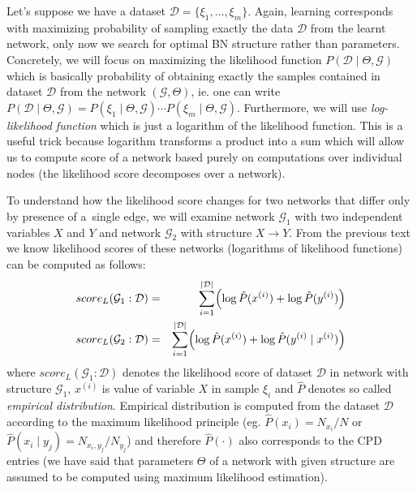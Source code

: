 \documentclass[english,cover]{fitthesis} %
\newcommand{\term}[1]{\emph{#1}}           %
\begin{document}
Let's suppose we have a dataset $\mathcal{D} = \lbrace \xi_1, \dots, \xi_m \rbrace$. Again, learning corresponds with maximizing probability of sampling exactly the data $\mathcal{D}$ from the learnt network, only now we search for optimal BN structure rather than parameters. Concretely, we will focus on maximizing the likelihood function $P(\mathcal{D} \mid \Theta, \mathcal{G})$ which is basically probability of obtaining exactly the samples contained in dataset $\mathcal{D}$ from the network $(\mathcal{G},\Theta)$, ie. one can write $P(\mathcal{D} \mid \Theta, \mathcal{G}) = P(\xi_1 \mid \Theta, \mathcal{G}) \dotsm P(\xi_m \mid \Theta, \mathcal{G})$. Furthermore, we will use \term{log-likelihood function} which is just a logarithm of the likelihood function. This is a useful trick because logarithm transforms a product into a sum which will allow us to compute score of a network based purely on computations over individual nodes (the likelihood score decomposes over a network).

To understand how the likelihood score changes for two networks that differ only by presence of a~single edge, we will examine network $\mathcal{G}_1$ with two independent variables $X$ and $Y$ and network $\mathcal{G}_2$ with structure $X \rightarrow Y$. From the previous text we know likelihood scores of these networks (logarithms of likelihood functions) can be computed as follows:
\begin{eqnarray*}
    score_L(\mathcal{G}_1 : \mathcal{D}) & = & \sum_{i=1}^{|\mathcal{D}|} \Bigl(\log \hat P(x^{(i)}) + \log \hat P(y^{(i)})\Bigr)\\
    score_L(\mathcal{G}_2 : \mathcal{D}) & = & \sum_{i=1}^{|\mathcal{D}|} \Bigl(\log \hat P(x^{(i)}) + \log \hat P(y^{(i)} \mid x^{(i)})\Bigr)
\end{eqnarray*}
where $score_L(\mathcal{G}_1 : \mathcal{D})$ denotes the likelihood score of dataset $\mathcal{D}$ in network with structure $\mathcal{G}_1$, $x^{(i)}$ is value of variable $X$ in sample $\xi_i$ and $\hat P$ denotes so called \term{empirical distribution}. Empirical distribution is computed from the dataset $\mathcal{D}$ according to the maximum likelihood principle (eg. $\hat P(x_i) = N_{x_i} / N$ or $\hat P(x_i \mid y_j) = N_{x_i,y_j} / N_{y_j}$) and therefore $\hat{P}(\cdot)$ also corresponds to the CPD entries (we have said that parameters $\Theta$ of a network with given structure are assumed to be computed using maximum likelihood estimation).
\end{document}
